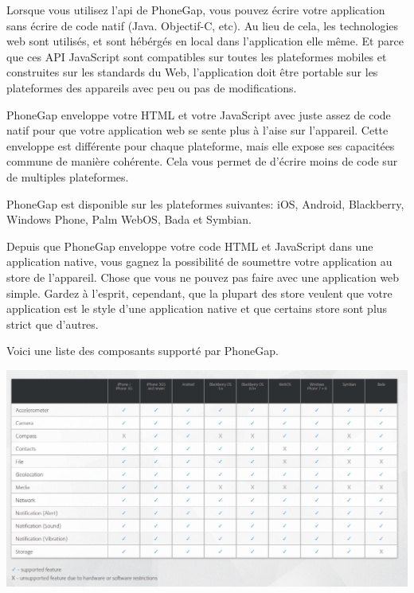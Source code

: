 Lorsque vous utilisez l’api de PhoneGap, vous pouvez écrire votre application sans écrire de code natif (Java. Objectif-C, etc). Au lieu de cela, les technologies web sont utilisés, et sont hébérgés en local dans l’application elle même. Et parce que ces API JavaScript sont compatibles sur toutes les plateformes mobiles et construites sur les standards du Web, l’application doit être portable sur les plateformes des appareils avec peu ou pas de modifications.

PhoneGap enveloppe votre HTML et votre JavaScript avec juste assez de code natif pour que votre application web se sente plus à l’aise sur l’appareil. Cette enveloppe est différente pour chaque plateforme, mais elle expose ses capacitées commune de manière cohérente. Cela vous permet de d’écrire moins de code sur de multiples plateformes.

PhoneGap est disponible sur les plateformes suivantes: iOS, Android, Blackberry, Windows Phone, Palm WebOS, Bada et Symbian.

Depuis que PhoneGap enveloppe votre code HTML et JavaScript dans une application native, vous gagnez la possibilité de soumettre votre application au store de l’appareil. Chose que vous ne pouvez pas faire avec une application web simple. Gardez à l’esprit, cependant, que la plupart des store veulent que votre application est le style d’une application native et que certains store sont plus strict que d’autres.

Voici une liste des composants supporté par PhoneGap.

\begin{center}
\includegraphics[width=14cm]{img/phonegapFeatures.png}
\label{Plateforme Wakanda}
\end{center}